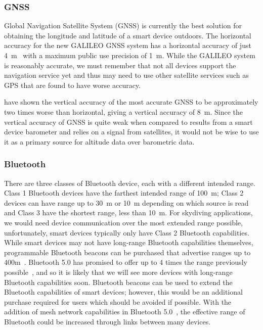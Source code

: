 \subsubsection{GNSS}\label{subsubsec:gps} %
Global Navigation Satellite System (GNSS) is currently the best solution for obtaining the longitude and latitude of a smart device outdoors. The horizontal accuracy for the new GALILEO GNSS system has a horizontal accuracy of just \SI{4}{\metre}~\cite{kaplan_understanding_2005} with a maximum public use precision of \SI{1}{\metre}. While the GALILEO system is reasonably accurate, we must remember that not all devices support the navigation service yet and thus may need to use other satellite services such as GPS that are found to have worse accuracy.

\textcite{kaplan_understanding_2005} have shown the vertical accuracy of the most accurate GNSS to be approximately two times worse than horizontal, giving a vertical accuracy of \SI{8}{\metre}. Since the vertical accuracy of GNSS is quite weak when compared to results from a smart device barometer and relies on a signal from satellites, it would not be wise to use it as a primary source for altitude data over barometric data.

\subsubsection{Bluetooth}\label{subsubsec:bluetooth} %

There are three classes of Bluetooth device, each with a different intended range. Class 1 Bluetooth devices have the farthest intended range of \SI{100}{\metre}; Class 2 devices can have range up to \SI{30}{\metre} or \SI{10}{\metre} depending on which source is read~\cite{_bluetooth_????, wright_dispelling_????} and Class 3 have the shortest range, less than \SI{10}{\metre}.
For skydiving applications, we would need device communication over the most extended range possible, unfortunately, smart devices typically only have Class 2 Bluetooth capabilities. While smart devices may not have long-range Bluetooth capabilities themselves, programmable Bluetooth beacons can be purchased that advertise ranges up to 400m~\cite{_coin_????}. Bluetooth 5.0 has promised to offer up to 4 times the range previously possible~\cite{bluetooth_sig_inc_rethinking_????}, and so it is likely that we will see more devices with long-range Bluetooth capabilities soon. Bluetooth beacons can be used to extend the Bluetooth capabilities of smart devices; however, this would be an additional purchase required for users which should be avoided if possible. With the addition of mesh network capabilities in Bluetooth 5.0~\cite{_mesh_????}, the effective range of Bluetooth could be increased through links between many devices.


